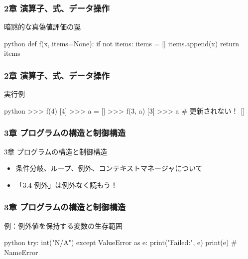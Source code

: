 \documentclass[aspectratio=169,dvipdfmx,12pt,notheorems]{beamer}
\theoremstyle{definition}
\begin{document}
\begin{frame}[fragile]\frametitle{2章 演算子、式、データ操作}

\begin{alertblock}{暗黙的な真偽値評価の罠}
\begin{pygments}{python}
def f(x, items=None):
    if not items:
        items = []
    items.append(x)
    return items
\end{pygments}
\end{alertblock}

\end{frame}

\begin{frame}[fragile]\frametitle{2章 演算子、式、データ操作}

\begin{exampleblock}{実行例}
\begin{pygments}{python}    
>>> f(4)
[4]
>>> a = []
>>> f(3, a)
[3]
>>> a  # 更新されない！
[]
\end{pygments}
\end{exampleblock}

\end{frame}

\begin{frame}\frametitle{3章 プログラムの構造と制御構造}

\begin{block}{3章 プログラムの構造と制御構造}
\begin{itemize}
\item 条件分岐、ループ、例外、コンテキストマネージャについて
\item 「3.4 例外」は例外なく読もう！
\end{itemize}
\end{block}

\end{frame}

\begin{frame}[fragile]\frametitle{3章 プログラムの構造と制御構造}

\begin{exampleblock}{例：例外値を保持する変数の生存範囲}
\begin{pygments}{python}    
try:
    int("N/A")
except ValueError as e:
    print("Failed:", e)
print(e)  # NameError
\end{pygments}
\end{exampleblock}

\end{frame}
\end{document}
